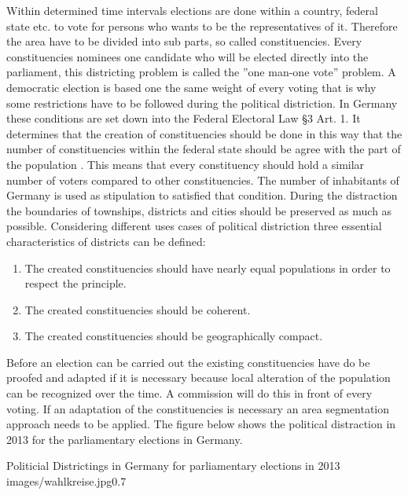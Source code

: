 Within determined time intervals elections are done within a country, federal state etc. to vote for persons who wants to be the representatives of it. Therefore the area have to be divided into sub parts, so called constituencies. Every constituencies nominees one candidate who will be elected directly into the parliament, this districting problem is called the ''one man-one vote'' problem.  A democratic election is based one the same weight of every voting that is why some restrictions have to be followed during the political distriction. In Germany these conditions are set down into the Federal Electoral Law §3 Art. 1. It determines that the creation of constituencies should be done in this way that the number of constituencies within the federal state should be agree with the part of the population \cite{bund}. This means that every constituency should hold a similar number of voters compared to other constituencies. The number of inhabitants of Germany is used as stipulation to satisfied that condition. During the distraction the boundaries of townships, districts and cities should be preserved as much as possible. Considering different uses cases of political distriction three essential characteristics of districts can be defined:
\begin{enumerate}
	\item The created constituencies should have nearly equal populations in order to respect the principle.
	\item The  created constituencies should be coherent.
	\item  The created constituencies should be geographically compact.
\end{enumerate}

Before an election can be carried out the existing constituencies have do be proofed and adapted if it is necessary because local alteration of the population can be recognized over the time. A commission will do this in front of every voting. If an adaptation of the constituencies is necessary an area segmentation approach needs to be applied. The figure below shows the political distraction in 2013 for the parliamentary elections in Germany.


\begin{figurevarSize}{Politicial Districtings in Germany for parliamentary elections in 2013 \cite{bund}}{images/wahlkreise.jpg}{0.7}\end{figurevarSize}


